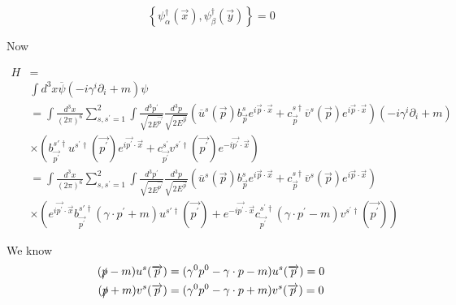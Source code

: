 \documentclass[12pt, letterpaper]{article}
\newcommand*{\1}{\hspace{1pt}}
\begin{document}
\begin{equation}
    \left\{ \psi ^{\dagger} _{\alpha} (\overrightarrow{x}) , \psi ^{\dagger} _{\beta }(\overrightarrow{y})  \right\} = 0
\end{equation}

Now 

\begin{align*}
    H &= \\
    & \int d ^{3} x \overline{\psi}(-i \gamma ^{i} \partial_{i} + m) \psi \\
    &= \int \frac{d ^{3}x}{(2 \pi)^{6}} \sum _{s, s^{\prime} = 1} ^{2} \int\frac{d ^{3} p^{\prime} }{\sqrt{2 E^{\overrightarrow{p^{\prime}}}}}  \frac{d ^{3} p}{\sqrt{2 E^{\overrightarrow{p}}}} (\overline{u} ^{s} (\overrightarrow{p}) b^{s} _{\overrightarrow{p}} e ^{i \overrightarrow{p} \cdot \overrightarrow{x}} + c^{s \dagger} _{\overrightarrow{p}}\overline{v}^{s}(\overrightarrow{p}) e ^{i \overrightarrow{p} \cdot \overrightarrow{x}}) (-i \gamma ^{i} \partial_{i} + m) \\
    & \times (b^{s \prime \dagger} _{\overrightarrow{p^{\prime}}}u^{s ^{\prime} \dagger}(\overrightarrow{p ^{\prime}}) e ^{i \overrightarrow{p ^{\prime}} \cdot \overrightarrow{x}} + c^{s ^{\prime}} _{\overrightarrow{p ^{\prime}}}v^{s^{\prime} \dagger}(\overrightarrow{p ^{\prime}}) e ^{ - i \overrightarrow{p ^{\prime}} \cdot \overrightarrow{x}}) \\
    &= \int \frac{d ^{3}x}{(2 \pi)^{6}} \sum _{s, s^{\prime} = 1} ^{2} \int \frac{d ^{3} p ^{\prime}}{\sqrt{2 E^{\overrightarrow{p^{\prime}}}}} \frac{d ^{3} p}{\sqrt{2 E^{\overrightarrow{p}}}} (\overline{u} ^{s} (\overrightarrow{p}) b^{s} _{\overrightarrow{p}} e ^{i \overrightarrow{p} \cdot \overrightarrow{x}} + c^{s \dagger} _{\overrightarrow{p}}\overline{v}^{s}(\overrightarrow{p}) e ^{i \overrightarrow{p} \cdot \overrightarrow{x}}) \\
    & \times (e ^{i \overrightarrow{p ^{\prime}} \cdot \overrightarrow{x}} b^{s \prime \dagger} _{\overrightarrow{p^{\prime}}}(\gamma \cdot p ^{\prime} + m)u^{s \prime \dagger}(\overrightarrow{p ^{\prime}})  + e ^{ - i \overrightarrow{p ^{\prime}} \cdot \overrightarrow{x}}c^{s ^{\prime} \dagger} _{\overrightarrow{p ^{\prime}}}(\gamma \cdot p ^{\prime} -  m)v^{s^{\prime} \dagger}(\overrightarrow{p ^{\prime}}))
\end{align*}

We know 
\begin{align*}
    (\slashed{p} - m)u^{s}(\overrightarrow{p})&= (\gamma^{0} p^{0} - \gamma \cdot p - m)  u^{s}(\overrightarrow{p}) = 0 \\
    (\slashed{p} + m)v^{s}(\overrightarrow{p})&= (\gamma^{0} p^{0} - \gamma \cdot p + m)  v^{s}(\overrightarrow{p}) = 0
\end{align*}
\end{document}

